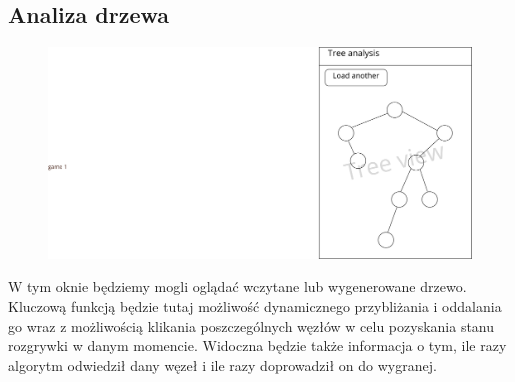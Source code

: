 \documentclass{article}
\begin{document}
	\subsection{Analiza drzewa}
	\begin{figure}[h!]
		\centering
		\includegraphics[scale=0.8, trim={18cm 0 0 0},clip]{analyze-eps}
	\end{figure}
	W tym oknie będziemy mogli oglądać wczytane lub wygenerowane drzewo. Kluczową funkcją będzie tutaj możliwość dynamicznego przybliżania i oddalania go wraz z możliwością klikania poszczególnych węzłów w celu pozyskania stanu rozgrywki w danym momencie. Widoczna będzie także informacja o tym, ile razy algorytm odwiedził dany węzeł i ile razy doprowadził on do wygranej.
\end{document}
